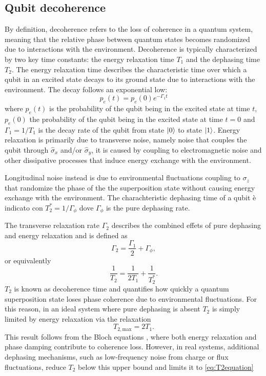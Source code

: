 \subsection{Qubit decoherence}\label{subsec:qubit_decoherence}
By definition, decoherence refers to the loss of coherence in a quantum system, meaning that the relative phase between quantum states becomes randomized due to interactions with the environment. 
Decoherence is typically characterized by two key time constants: the energy relaxation time $T_1$ and the dephasing time $T_2$. 
The energy relaxation time  describes the characteristic time over which a qubit in an excited state decays to its ground state due to interactions with the environment. The decay follows an exponential low:
\begin{equation}\label{eq:gamma1}
    p_e(t) = p_e(0) e^{-\Gamma_1 t}
\end{equation}
where $p_e(t)$ is the probability of the qubit being in the excited state at time $t$, $p_e(0)$ the probability of the qubit being in the excited state at time $t=0$ and $\Gamma_1=1/T_1$ is the decay rate of the qubit from state $\ket{0}$ to state $\ket{1}$.
Energy relaxation is primarily due to transverse noise, namely noise that couples the qubit through $\hat{\sigma}_x$ and/or $\hat{\sigma}_y$, it is caused by coupling to electromagnetic noise and other dissipative processes that induce energy exchange with the environment.

Longitudinal noise instead is due to environmental fluctuations coupling to $\sigma_z$ that randomize the phase of the the superposition state without causing energy exchange with the environment.
The charachteristic dephasing time of a qubit è indicato con $T_2^* = 1/\Gamma_\phi$ dove $\Gamma_\phi$ is the pure dephasing rate.

The transverse relaxation rate $\Gamma_2$ describes the combined effets of pure dephasing and energy relaxation and is defined as 
\begin{equation}\label{eq:gamma2}
    \Gamma_2 = \frac{\Gamma_1}{2} + \Gamma_\phi,
\end{equation}
or equivalently
\begin{equation}\label{eq:T2equation}
    \frac{1}{T_2} = \frac{1}{2T_1} + \frac{1}{T_2^*}.
\end{equation}
$T_2$ is known as decoherence time and quantifies how quickly a quantum superposition state loses phase coherence due to environmental fluctuations. 
For this reason, in an ideal system where pure dephasing is absent $T_2$ is simply limited by energy relaxation via the relaxation\begin{equation}\label{eq:T2max}
    T_{2,\text{max}} = 2T_1.
\end{equation}
This result follows from the Bloch equations \cite{krantz_quantum_2019}, where both energy relaxation and phase damping contribute to coherence loss. 
However, in real systems, additional dephasing mechanisms, such as low-frequency noise from charge or flux fluctuations, reduce $T_2$ below this upper bound and limits it to \ref{eq:T2equation}

